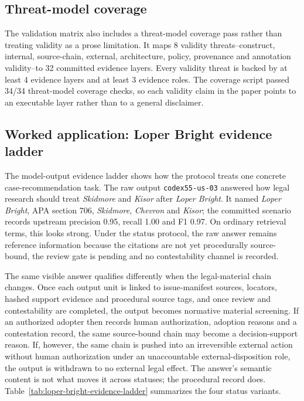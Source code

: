 \documentclass[12pt,a4paper]{article}
\begin{document}
\subsection{Threat-model coverage}

The validation matrix also includes a threat-model coverage pass rather than treating validity as a prose limitation. It maps 8 validity threats--construct, internal, source-chain, external, architecture, policy, provenance and annotation validity--to 32 committed evidence layers. Every validity threat is backed by at least 4 evidence layers and at least 3 evidence roles. The coverage script passed 34/34 threat-model coverage checks, so each validity claim in the paper points to an executable layer rather than to a general disclaimer.

\subsection{Worked application: Loper Bright evidence ladder}

The model-output evidence ladder shows how the protocol treats one concrete case-recommendation task. The raw output \texttt{codex55-us-03} answered how legal research should treat \textit{Skidmore} and \textit{Kisor} after \textit{Loper Bright}. It named \textit{Loper Bright}, APA section 706, \textit{Skidmore}, \textit{Chevron} and \textit{Kisor}; the committed scenario records upstream precision 0.95, recall 1.00 and F1 0.97. On ordinary retrieval terms, this looks strong. Under the status protocol, the raw answer remains reference information because the citations are not yet procedurally source-bound, the review gate is pending and no contestability channel is recorded.

The same visible answer qualifies differently when the legal-material chain changes. Once each output unit is linked to issue-manifest sources, locators, hashed support evidence and procedural source tags, and once review and contestability are completed, the output becomes normative material screening. If an authorized adopter then records human authorization, adoption reasons and a contestation record, the same source-bound chain may become a decision-support reason. If, however, the same chain is pushed into an irreversible external action without human authorization under an unaccountable external-disposition role, the output is withdrawn to no external legal effect. The answer's semantic content is not what moves it across statuses; the procedural record does. Table~\ref{tab:loper-bright-evidence-ladder} summarizes the four status variants.
\end{document}
